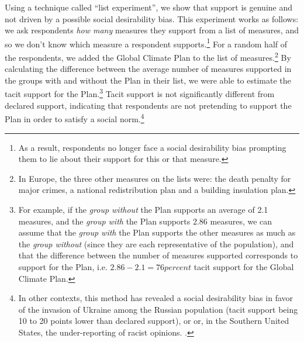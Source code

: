 \documentclass[a5paper,english,openany]{memoir}
\begin{document}
Using a technique called ``list experiment'', we show that support is genuine and not driven by a possible social desirability bias. This experiment works as follows: we ask respondents \textit{how many} measures they support from a list of measures, and so we don't know which measure a respondent supports.\footnote{As a result, respondents no longer face a social desirability bias prompting them to lie about their support for this or that measure.} 
For a random half of the respondents, we added %
the Global Climate Plan to the list of measures.\footnote{In Europe, the three other measures on the lists were: %
the death penalty for major crimes, a national redistribution plan and a building insulation plan.} 
By calculating the difference between the average number of measures supported in the groups with and without the Plan in their list, we were able to %
estimate the tacit support for the Plan.\footnote{For example, if the \textit{group without} the Plan supports an average of 2.1 measures, and the \textit{group with} the Plan supports 2.86 measures, we can assume that the \textit{group with} the Plan supports the other measures as much as the \textit{group without} (since they are each representative of the population), and that the difference between the number of measures supported corresponds to support for the Plan, i.e. $2.86 - 2.1 = 76 percent$ tacit support for the Global Climate Plan.} %
Tacit support is not significantly different from declared support, indicating that respondents are not pretending to support the Plan in order to satisfy a social norm.\footnote{In other contexts, this method has revealed a social desirability bias in favor %
of the invasion of Ukraine among the Russian population (tacit support being 10 to 20 points lower than declared support), or or, in the Southern United States, the under-reporting of racist opinions. %
\citep{kuklinski_racial_1997,chapkovski_solid_2022}.} 
\end{document}
